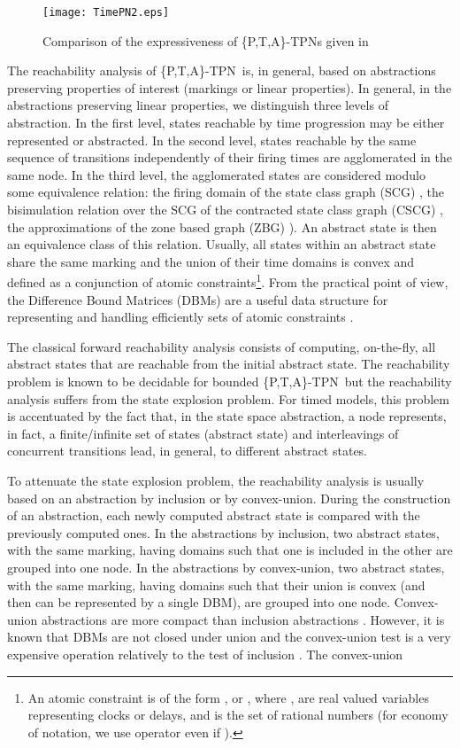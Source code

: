 \documentclass[submission,copyright,creativecommons]{eptcs}
\numberwithin{equation}{section}
\def\ttappn{\{P,T,A\}-TPN}
\begin{document}
\begin{figure}[ht!]
\centering
\texttt{[image: TimePN2.eps]}
\caption{Comparison of the expressiveness of \{P,T,A\}-TPNs given in \cite{boyer-FI-08}}
\label{fig:Exemple}       \end{figure}
The reachability analysis of \ttappn~is, in general, based on abstractions preserving properties of interest (markings or linear properties). In general, in the abstractions preserving linear properties, we distinguish three levels of abstraction. In the first level, states reachable by time progression may be
either represented or abstracted. In the second level, states reachable by
the same sequence of transitions independently of their firing times are
agglomerated in the same node. In the third level, the
agglomerated states are considered modulo some equivalence relation:
 the firing domain of the state class graph (SCG) \cite{BVer03}, the
bisimulation relation over the SCG of the contracted state class graph (CSCG) \cite{acsd07}, the approximations of the zone based graph (ZBG) \cite{Bou09}). An abstract state is then an equivalence class of this relation. Usually, all states within an abstract state share the same marking and the union of their time domains is convex and defined as a conjunction of atomic constraints\footnote{An atomic constraint is of the form ,  or , where ,  are real valued variables representing clocks or delays,  and  is the set of rational numbers (for economy of notation, we use operator  even if
).}. From the practical point of view, the Difference Bound Matrices (DBMs) are a useful data structure for representing and handling efficiently sets of atomic constraints \cite{Bouyer06}.
\par The classical forward reachability analysis consists of computing, on-the-fly, all abstract states that are reachable from the initial abstract state. The reachability problem is known to be decidable for bounded \ttappn~but the reachability analysis suffers from the state explosion problem. For timed models, this problem is accentuated by the fact that, in the state space abstraction, a node represents, in fact, a finite/infinite set of states (abstract state) and interleavings of concurrent transitions lead, in general, to different abstract states.
\par To attenuate the state explosion problem, the reachability analysis is usually based on an abstraction by inclusion or by convex-union. During the construction of an abstraction, each newly computed abstract state is compared with the previously computed ones. In the abstractions by inclusion, two abstract states, with the same marking, having domains such that one is included in the other are grouped into one node. In the abstractions by convex-union, two abstract states, with the same marking, having domains such that their union is convex (and then can be represented by a single DBM), are grouped into one node. Convex-union abstractions are more compact than inclusion abstractions \cite{HadjBouc-STTT-08}. However, it is known that DBMs are not closed under union and the convex-union test is a very expensive operation relatively to the test of inclusion \cite{HadjBouc-STTT-08}. The convex-union
\end{document}
